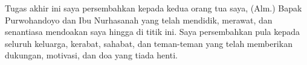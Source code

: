\vspace{7cm}

\begin{center}
	Tugas akhir ini saya persembahkan kepada kedua orang tua saya, (Alm.) 
	Bapak Purwohandoyo dan Ibu Nurhasanah yang telah mendidik, merawat, dan 
	senantiasa mendoakan saya hingga di titik ini. Saya persembahkan pula 
	kepada seluruh keluarga, kerabat, sahabat, dan teman-teman yang telah 
	memberikan dukungan, motivasi, dan doa yang tiada henti.
\end{center}

